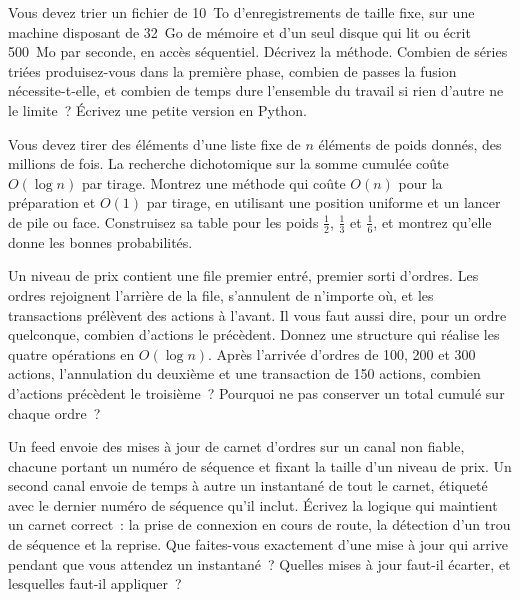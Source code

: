 \begin{question}\label{iq:iv3:algorithms:64}
Vous devez trier un fichier de 10~To d'enregistrements de taille fixe, sur une machine disposant de 32~Go de mémoire et d'un seul disque qui lit ou écrit 500~Mo par seconde, en accès séquentiel. Décrivez la méthode. Combien de séries triées produisez-vous dans la première phase, combien de passes la fusion nécessite-t-elle, et combien de temps dure l'ensemble du travail si rien d'autre ne le limite~? Écrivez une petite version en Python.
\end{question}

\begin{question}\label{iq:iv3:algorithms:65}
Vous devez tirer des éléments d'une liste fixe de $n$ éléments de poids donnés, des millions de fois. La recherche dichotomique sur la somme cumulée coûte $O(\log n)$ par tirage. Montrez une méthode qui coûte $O(n)$ pour la préparation et $O(1)$ par tirage, en utilisant une position uniforme et un lancer de pile ou face. Construisez sa table pour les poids $\frac{1}{2}$, $\frac{1}{3}$ et $\frac{1}{6}$, et montrez qu'elle donne les bonnes probabilités.
\end{question}

\begin{question}\label{iq:iv3:algorithms:66}
Un niveau de prix contient une file premier entré, premier sorti d'ordres. Les ordres rejoignent l'arrière de la file, s'annulent de n'importe où, et les transactions prélèvent des actions à l'avant. Il vous faut aussi dire, pour un ordre quelconque, combien d'actions le précèdent. Donnez une structure qui réalise les quatre opérations en $O(\log n)$. Après l'arrivée d'ordres de 100, 200 et 300 actions, l'annulation du deuxième et une transaction de 150 actions, combien d'actions précèdent le troisième~? Pourquoi ne pas conserver un total cumulé sur chaque ordre~?
\end{question}

\begin{question}\label{iq:iv3:algorithms:67}
Un feed envoie des mises à jour de carnet d'ordres sur un canal non fiable, chacune portant un numéro de séquence et fixant la taille d'un niveau de prix. Un second canal envoie de temps à autre un instantané de tout le carnet, étiqueté avec le dernier numéro de séquence qu'il inclut. Écrivez la logique qui maintient un carnet correct~: la prise de connexion en cours de route, la détection d'un trou de séquence et la reprise. Que faites-vous exactement d'une mise à jour qui arrive pendant que vous attendez un instantané~? Quelles mises à jour faut-il écarter, et lesquelles faut-il appliquer~?
\end{question}

